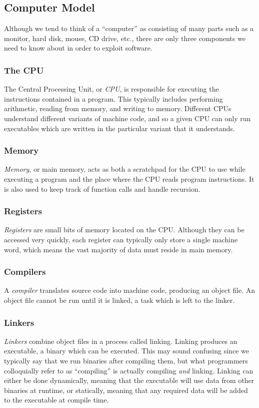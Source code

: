 \documentclass{article}
\begin{document}
\subsection{Computer Model}
Although we tend to think of a ``computer'' as consisting of many parts such as
a monitor, hard disk, mouse, CD drive, etc., there are only three components we
need to know about in order to exploit software.

\subsubsection{The CPU}
The Central Processing Unit, or \emph{CPU}, is responsible for executing the
instructions contained in a program. This typically includes performing
arithmetic, reading from memory, and writing to memory. Different CPUs
understand different variants of machine code, and so a given CPU can only run
executables which are written in the particular variant that it understands.

\subsubsection{Memory}
\emph{Memory}, or main memory, acts as both a scratchpad for the CPU to use
while executing a program and the place where the CPU reads program
instructions. It is also used to keep track of function calls and handle
recursion.

\subsubsection{Registers}
\emph{Registers} are small bits of memory located on the CPU. Although they can
be accessed very quickly, each register can typically only store a single
machine word, which means the vast majority of data must reside in main memory. 

\subsubsection{Compilers}
A \emph{compiler} translates source code into machine code, producing an object
file. An object file cannot be run until it is linked, a task which is left
to the linker. 

\subsubsection{Linkers}
\emph{Linkers} combine object files in a process called linking. Linking
produces an executable, a binary which can be executed. This may sound confusing
since we typically say that we run binaries after compiling them, but what
programmers colloquially refer to as ``compiling'' is actually compiling
\textit{and} linking. Linking can either be done dynamically, meaning that the
executable will use data from other binaries at runtime, or statically, meaning
that any required data will be added to the executable at compile time.
\end{document}
